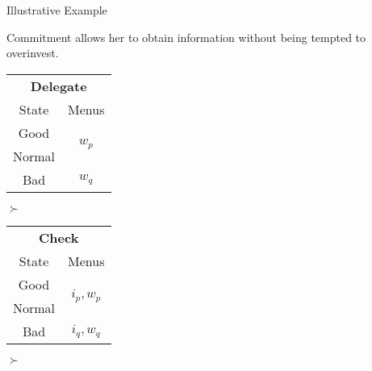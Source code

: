 \documentclass[usenames,dvipsnames,aspectratio=169,11pt, envcountsect, handout]{beamer}
\begin{document}
\begin{frame}[noframenumbering]{Illustrative Example}

	Commitment allows her to obtain information without being tempted to overinvest.

	\vfill

	\begin{table}[H]
		\centering
		\begin{minipage}{0.29\textwidth}
			\centering
			\begin{tabular}{c | c}
				\multicolumn{2}{c}{\textbf{Delegate}}                           \\
				State                & Menus                                    \\
				\hline
				{\color{blue}Good}   & \multirow{2}{*}{{\color{blue}\( w_p \)}} \\
				{\color{blue}Normal} &                                          \\
				Bad                  & \( w_q \)                                \\
			\end{tabular}
			\vspace{0.5cm} %
		\end{minipage}\hspace{0.3cm} %
		\( \succ \) %
		\begin{minipage}{0.29\textwidth}
			\centering
			\begin{tabular}{c | c}
				\multicolumn{2}{c}{\textbf{Check}}                                     \\
				State                & Menus                                           \\
				\hline
				{\color{blue}Good}   & \multirow{2}{*}{{\color{blue}\( i_{p}, w_p \)}} \\
				{\color{blue}Normal} &                                                 \\
				Bad                  & \(  i_{q}, w_q \)                               \\
			\end{tabular}
			\vspace{0.5cm} %
		\end{minipage}\hspace{0.3cm} %
		\( \succ \) %

\end{table}
\end{frame}
\end{document}
